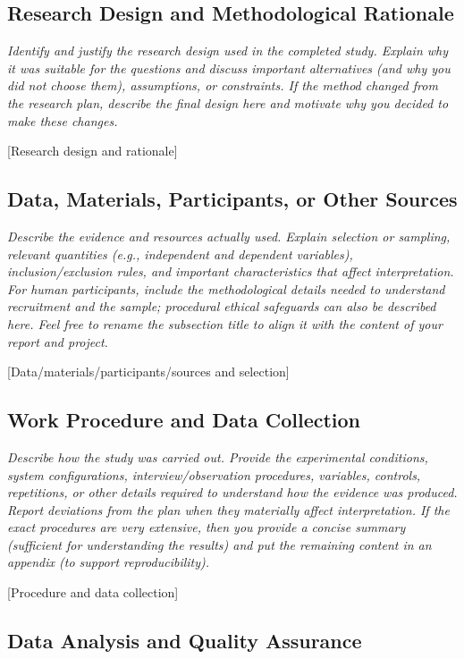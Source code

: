 \documentclass[11pt,a4paper]{article}
\newcommand{\guidance}[1]{%
  {\setstretch{1.0}\fontsize{9}{11}\selectfont\color{guidancetext}\itshape #1\par}%
  \vspace{-6pt}%
}
\newcommand{\placeholder}[1]{#1\par}
\begin{document}
\subsection{Research Design and Methodological Rationale}

\guidance{Identify and justify the research design used in the completed study. Explain why it was suitable for the questions and discuss important alternatives (and why you did not choose them), assumptions, or constraints. If the method changed from the research plan, describe the final design here and motivate why you decided to make these changes.}

\placeholder{[Research design and rationale]}

\subsection{Data, Materials, Participants, or Other Sources}

\guidance{Describe the evidence and resources actually used. Explain selection or sampling, relevant quantities (e.g., independent and dependent variables), inclusion/exclusion rules, and important characteristics that affect interpretation. For human participants, include the methodological details needed to understand recruitment and the sample; procedural ethical safeguards can also be described here. Feel free to rename the subsection title to align it with the content of your report and project.}

\placeholder{[Data/materials/participants/sources and selection]}

\subsection{Work Procedure and Data Collection}

\guidance{Describe how the study was carried out. Provide the experimental conditions, system configurations, interview/observation procedures, variables, controls, repetitions, or other details required to understand how the evidence was produced. Report deviations from the plan when they materially affect interpretation. If the exact procedures are very extensive, then you provide a concise summary (sufficient for understanding the results) and put the remaining content in an appendix (to support reproducibility).}

\placeholder{[Procedure and data collection]}

\subsection{Data Analysis and Quality Assurance}
\end{document}
